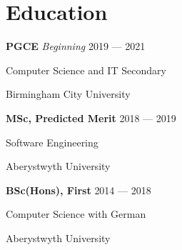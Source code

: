 \section{Education}
\parbox[t][][t]{\linewidth}{
	\parbox{\linewidth}{\textbf{PGCE} \hfill {{\textit{Beginning} 2019 --- 2021}}}
	\parbox{\linewidth}{Computer Science and IT Secondary}
	\parbox{\linewidth}{{Birmingham City University}}
	\smallskip
}

\parbox[t][][t]{\linewidth}{
	\parbox{\linewidth}{\textbf{MSc, Predicted Merit} \hfill {{2018 --- 2019}}}
	\parbox{\linewidth}{{Software Engineering}}
	\parbox{\linewidth}{{Aberystwyth University}}
	\smallskip
}

\parbox[t][][t]{\linewidth}{
	\parbox{\linewidth}{\textbf{BSc(Hons), First} \hfill {{2014 --- 2018}}}
	\parbox{\linewidth}{{Computer Science with German}}
	\parbox{\linewidth}{{Aberystwyth University}}
	\smallskip
}

